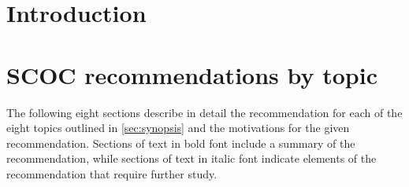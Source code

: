 \section{Introduction}




%
\clearpage
\section{SCOC recommendations by topic}\label{sec:rec}
The following eight sections describe in detail the recommendation for each of the eight topics outlined in \autoref{sec:synopsis} and the motivations for the given recommendation. Sections of text in bold font include a summary of the recommendation, while sections of text in italic font indicate elements of the recommendation that require further study. 


\clearpage
